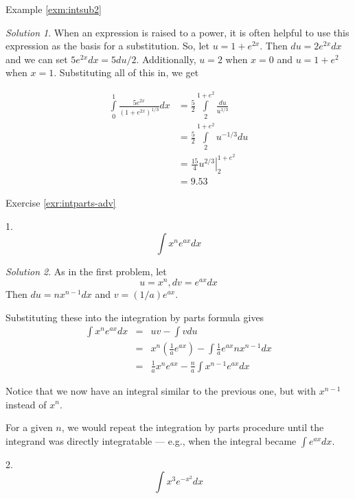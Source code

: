 \documentclass[
]{book}
\theoremstyle{definition}
\theoremstyle{definition}
\theoremstyle{definition}
\theoremstyle{definition}
\theoremstyle{remark}
\newtheorem*{solution}{Solution}
\begin{document}
Example \ref{exm:intsub2}
\begin{solution}
{}When an expression is raised to a power, it is often helpful to use this expression as the basis for a substitution. So, let \(u=1+e^{2x}\). Then \(du=2e^{2x}dx\) and we can set \(5e^{2x}dx=5du/2\). Additionally, \(u=2\) when \(x=0\) and \(u=1+e^2\) when \(x=1\). Substituting all of this in, we get

\begin{align*}
\int\limits_0^1 \frac{5e^{2x}}{(1+e^{2x})^{1/3}}dx
            &= \frac{5}{2}\int\limits_2^{1+e^2}\frac{du}{u^{1/3}}\\
            &= \frac{5}{2}\int\limits_2^{1+e^2} u^{-1/3}du\\
            &= \left. \frac{15}{4} u^{2/3} \right|_2^{1+e^2}\\
            &= 9.53
\end{align*}
\end{solution}

Exercise \ref{exr:intparts-adv}

1. \[\int x^n e^{ax} dx\]
\begin{solution}
{}
As in the first problem, let
\[u=x^n, dv=e^{ax}dx\]
Then \(du=n x^{n-1}dx\) and \(v=(1/a)e^{ax}\).

Substituting these into the integration by parts formula gives
\begin{eqnarray}
            \int x^n e^{ax} dx &=& u v - \int v du\nonumber\\
            &=&x^n\left( \frac{1}{a}e^{ax}\right) - \int\frac{1}{a}e^{ax} n x^{n-1} dx\nonumber\\
            &=&\frac{1}{a}x^n e^{ax} - \frac{n}{a}\int x^{n-1}e^{ax}dx\nonumber
\end{eqnarray}

Notice that we now have an integral similar to the previous one, but with \(x^{n-1}\) instead of \(x^n\).

For a given \(n\), we would repeat the integration by parts procedure until the integrand was directly integratable --- e.g., when the integral became \(\int e^{ax}dx\).
\end{solution}

2. \[\int x^3 e^{-x^2} dx\]
\end{document}
